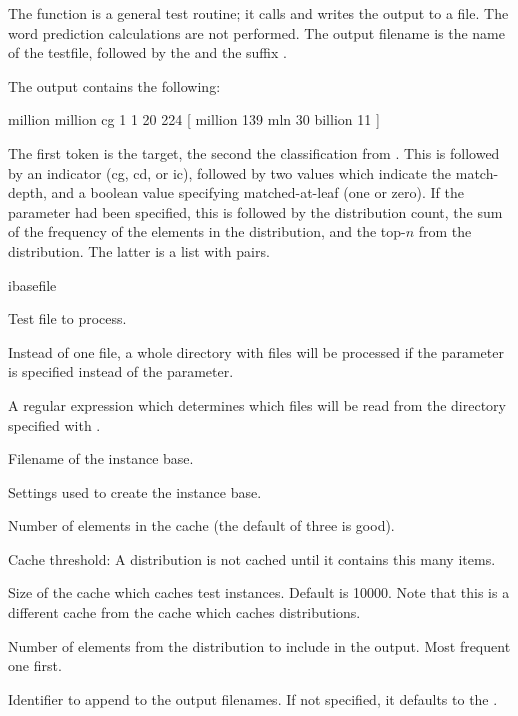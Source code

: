 \documentclass[a4paper,10pt,twoside]{report}
\begin{document}
The  function is a general test routine; it calls \Timbl{} and
writes the output to a file. The word prediction calculations are not
performed. The output filename is the name of the testfile, followed
by the  and the suffix .

The output contains the following:

\begin{wout}{}
million million cg 1 1 20 224 [ million 139 mln 30 billion 11 ]
\end{wout}

The first token is the target, the second the classification from
\Timbl{}. This is followed by an indicator (cg, cd, or ic), followed
by two values which indicate the match-depth, and a boolean value
specifying matched-at-leaf (one or zero). If the  parameter
had been specified, this is followed by the distribution count, the
sum of the frequency of the elements in the distribution, and the
top-$n$ from the distribution. The latter is a list with
 pairs.

\begin{varlist}{ibasefile}
\item[filename] Test file to process.
\item[dir] Instead of one file, a whole directory with files will be
  processed if the  parameter is specified instead of the
   parameter.
\item[dirmatch] A regular expression which determines which files will
  be read from the directory specified with .
\item[ibasefile] Filename of the instance base.
\item[timbl] Settings used to create the instance base.
\item[cache] Number of elements in the cache (the default of three is
  good). 
\item[cth] Cache threshold: A distribution is not cached until it
  contains this many items.
\item[cs] Size of the cache which caches test instances. Default is
  \num{10000}. Note that this is a different cache from the cache which
  caches distributions. 
\item[topn] Number of elements from the \Timbl{} distribution to
  include in the output. Most frequent one first.
\item[id] Identifier to append to the output filenames. If not
  specified, it defaults to the \pid{}.
\end{varlist}
\end{document}
